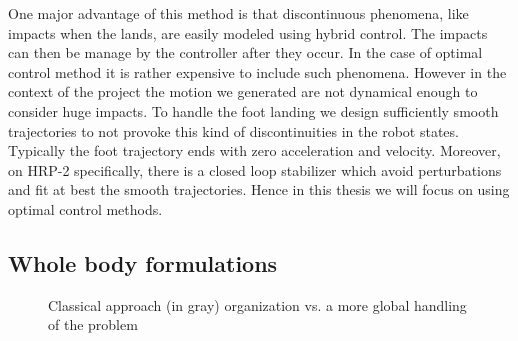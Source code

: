 One major advantage of this method is that discontinuous phenomena, like impacts when the lands, are easily modeled using hybrid control.
The impacts can then be manage by the controller after they occur.
In the case of optimal control method it is rather expensive to include such phenomena.
However in the context of the \koroibot project the motion we generated are not dynamical enough to consider huge impacts.
To handle the foot landing we design sufficiently smooth trajectories to not provoke this kind of discontinuities in the robot states.
Typically the foot trajectory ends with zero acceleration and velocity.
Moreover, on HRP-2 specifically, there is a closed loop stabilizer which avoid perturbations and fit at best the smooth trajectories.
Hence in this thesis we will focus on using optimal control methods.

\subsection*{Whole body formulations}

\begin{figure}[ht]
\caption{Classical approach (in gray) organization vs. a more global handling of the problem \cite{Todorov:ICRA:2014}}
\label{fig:classical_vs_ddp}
\end{figure}

